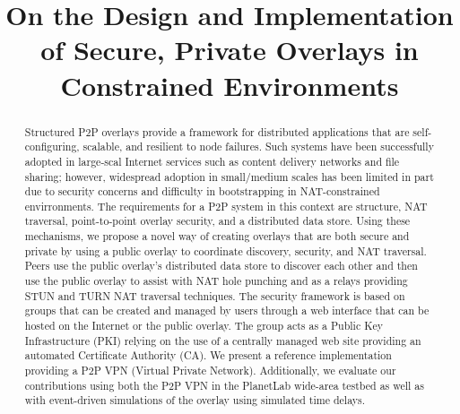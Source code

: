 \documentclass[conference]{IEEEtran}
\begin{document}
\title{On the Design and Implementation of Secure, Private Overlays in
Constrained Environments}

\author{ 
}

\maketitle

\begin{abstract}
Structured P2P overlays provide a framework for distributed applications that
are self-configuring, scalable, and resilient to node failures.  Such systems
have been successfully adopted in large-scal Internet services such as content
delivery networks and file sharing; however, widespread adoption in small/medium
scales has been limited in part due to security concerns and difficulty in
bootstrapping in NAT-constrained envirronments.  The requirements for
a P2P system in this context are structure, NAT traversal, point-to-point overlay
security, and a distributed data store.  Using these mechanisms, we propose
a novel way of creating overlays that are both secure and
private by using a public overlay to coordinate discovery, security, and NAT
traversal.  Peers use the public overlay's distributed data store to discover
each other and then use the public overlay to assist with NAT hole punching
and as a relays providing STUN and TURN NAT traversal techniques.  The security
framework is based on groups that can be created and managed by users through
a web interface that can be hosted on the Internet or the public overlay.
The group acts as a Public Key Infrastructure (PKI) relying on
the use of a centrally managed web site providing an automated Certificate
Authority (CA).  We present a reference implementation providing a P2P VPN
(Virtual Private Network).  Additionally, we evaluate our contributions using
both the P2P VPN in the PlanetLab wide-area testbed as well as with event-driven
simulations of the overlay using simulated time delays.
\end{abstract}
\end{document}
